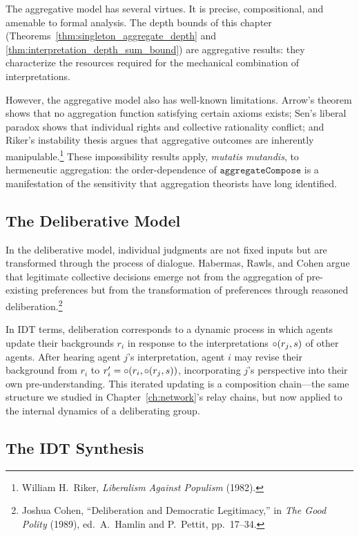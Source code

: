 The aggregative model has several virtues.  It is precise, compositional,
and amenable to formal analysis.  The depth bounds of this chapter
(Theorems~\ref{thm:singleton_aggregate_depth} and
\ref{thm:interpretation_depth_sum_bound}) are aggregative results: they
characterize the resources required for the mechanical combination of
interpretations.

However, the aggregative model also has well-known limitations.  Arrow's
theorem shows that no aggregation function satisfying certain axioms
exists; Sen's liberal paradox shows that individual rights and collective
rationality conflict; and Riker's instability thesis argues that
aggregative outcomes are inherently manipulable.\footnote{William H.\ Riker,
\textit{Liberalism Against Populism} (1982).}  These impossibility results
apply, \textit{mutatis mutandis}, to hermeneutic aggregation: the order-dependence of $\texttt{aggregateCompose}$ is a manifestation of the
sensitivity that aggregation theorists have long identified.

\subsection{The Deliberative Model}

In the deliberative model, individual judgments are not fixed inputs but
are transformed through the process of dialogue.  Habermas, Rawls, and
Cohen argue that legitimate collective decisions emerge not from the
aggregation of pre-existing preferences but from the transformation of
preferences through reasoned deliberation.\footnote{Joshua Cohen,
``Deliberation and Democratic Legitimacy,'' in \textit{The Good Polity}
(1989), ed.\ A.\ Hamlin and P.\ Pettit, pp.\ 17--34.}

In IDT terms, deliberation corresponds to a dynamic process in which
agents update their backgrounds $r_i$ in response to the interpretations
$\circ(r_j, s)$ of other agents.  After hearing agent $j$'s
interpretation, agent $i$ may revise their background from $r_i$ to
$r_i' = \circ(r_i, \circ(r_j, s))$, incorporating $j$'s perspective
into their own pre-understanding.  This iterated updating is a composition
chain---the same structure we studied in Chapter~\ref{ch:network}'s relay
chains, but now applied to the internal dynamics of a deliberating group.

\subsection{The IDT Synthesis}

